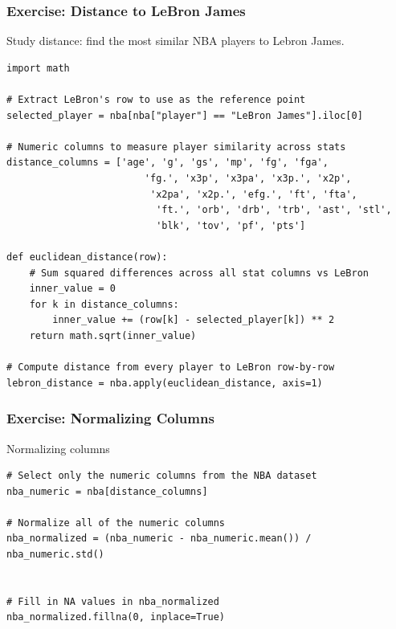 \begin{frame}[fragile]\frametitle{Exercise: Distance to LeBron James}
Study distance: find the most similar NBA players to Lebron James.
\begin{lstlisting}
import math

# Extract LeBron's row to use as the reference point
selected_player = nba[nba["player"] == "LeBron James"].iloc[0]

# Numeric columns to measure player similarity across stats
distance_columns = ['age', 'g', 'gs', 'mp', 'fg', 'fga',
						'fg.', 'x3p', 'x3pa', 'x3p.', 'x2p',
						 'x2pa', 'x2p.', 'efg.', 'ft', 'fta',
						  'ft.', 'orb', 'drb', 'trb', 'ast', 'stl',
						  'blk', 'tov', 'pf', 'pts']

def euclidean_distance(row):
    # Sum squared differences across all stat columns vs LeBron
    inner_value = 0
    for k in distance_columns:
        inner_value += (row[k] - selected_player[k]) ** 2
    return math.sqrt(inner_value)

# Compute distance from every player to LeBron row-by-row
lebron_distance = nba.apply(euclidean_distance, axis=1)
\end{lstlisting}
\end{frame}

\begin{frame}[fragile]\frametitle{Exercise: Normalizing Columns}
Normalizing columns
\begin{lstlisting}
# Select only the numeric columns from the NBA dataset
nba_numeric = nba[distance_columns]

# Normalize all of the numeric columns
nba_normalized = (nba_numeric - nba_numeric.mean()) / nba_numeric.std()


# Fill in NA values in nba_normalized
nba_normalized.fillna(0, inplace=True)
\end{lstlisting}
\end{frame}

